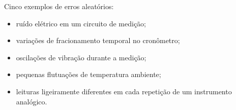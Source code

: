 Cinco exemplos de erros aleatórios:
\begin{itemize}
\item ruído elétrico em um circuito de medição;
\item variações de fracionamento temporal no cronômetro;
\item oscilações de vibração durante a medição;
\item pequenas flutuações de temperatura ambiente;
\item leituras ligeiramente diferentes em cada repetição de um instrumento analógico.
\end{itemize}